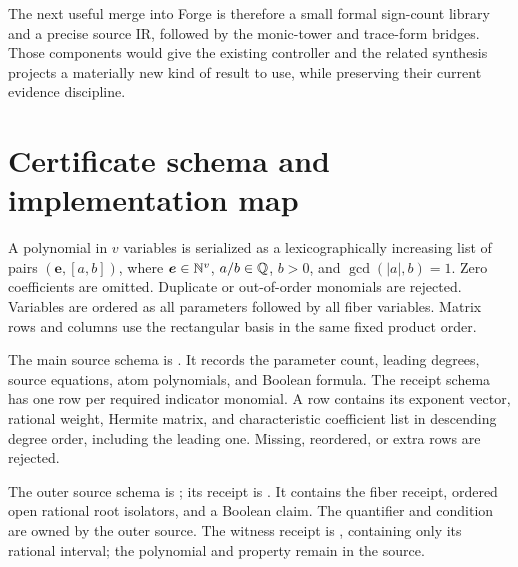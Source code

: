 The next useful merge into Forge is therefore a small formal sign-count library and a precise source IR, followed by the monic-tower and trace-form bridges. Those components would give the existing controller and the related synthesis projects a materially new kind of result to use, while preserving their current evidence discipline.

\appendix
\section{Certificate schema and implementation map}\label{app:schema}

A polynomial in $v$ variables is serialized as a lexicographically increasing list of pairs $(\bm e,[a,b])$, where $\bm e\in\mathbb N^v$, $a/b\in\mathbb Q$, $b>0$, and $\gcd(|a|,b)=1$. Zero coefficients are omitted. Duplicate or out-of-order monomials are rejected. Variables are ordered as all parameters followed by all fiber variables. Matrix rows and columns use the rectangular basis in the same fixed product order.

The main source schema is . It records the parameter count, leading degrees, source equations, atom polynomials, and Boolean formula. The receipt schema  has one row per required indicator monomial. A row contains its exponent vector, rational weight, Hermite matrix, and characteristic coefficient list in descending degree order, including the leading one. Missing, reordered, or extra rows are rejected.

The outer source schema is ; its receipt is . It contains the fiber receipt, ordered open rational root isolators, and a Boolean claim. The quantifier and condition are owned by the outer source. The witness receipt is , containing only its rational interval; the polynomial and property remain in the source.

